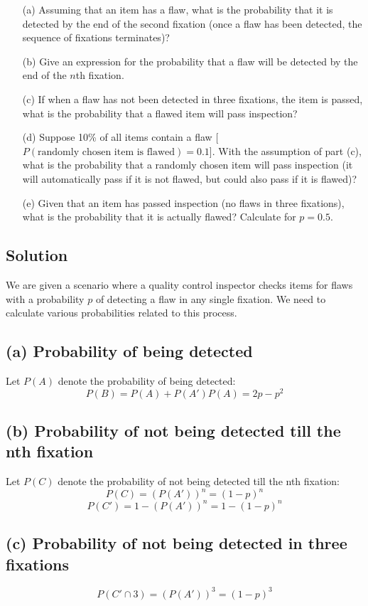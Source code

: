 \documentclass{article}
\begin{document}
\begin{enumerate}
    \item[(a)] Assuming that an item has a flaw, what is the probability that it is detected by the end of the second fixation (once a flaw has been detected, the sequence of fixations terminates)?
    \item[(b)] Give an expression for the probability that a flaw will be detected by the end of the $n$th fixation.
    \item[(c)] If when a flaw has not been detected in three fixations, the item is passed, what is the probability that a flawed item will pass inspection?
    \item[(d)] Suppose 10\% of all items contain a flaw [$P(\text{randomly chosen item is flawed}) = 0.1$]. With the assumption of part (c), what is the probability that a randomly chosen item will pass inspection (it will automatically pass if it is not flawed, but could also pass if it is flawed)?
    \item[(e)] Given that an item has passed inspection (no flaws in three fixations), what is the probability that it is actually flawed? Calculate for $p = 0.5$.
\end{enumerate}
\subsection*{Solution}
We are given a scenario where a quality control inspector checks items for flaws with a probability $p$ of detecting a flaw in any single fixation. We need to calculate various probabilities related to this process.

\subsection*{(a) Probability of being detected}
Let $P(A)$ denote the probability of being detected:
\[
P(B) = P(A) + P(A')P(A) = 2p -p^2
\]

\subsection*{(b) Probability of not being detected till the nth fixation}
Let $P(C)$ denote the probability of not being detected till the nth fixation:
\[
P(C) = (P(A'))^n = (1-p)^n
\]
\[
P(C') = 1 - (P(A'))^n = 1 - (1-p)^n
\]

\subsection*{(c) Probability of not being detected in three fixations}
\[
P(C' \cap 3) = (P(A'))^3 = (1-p)^3
\]
\end{document}
